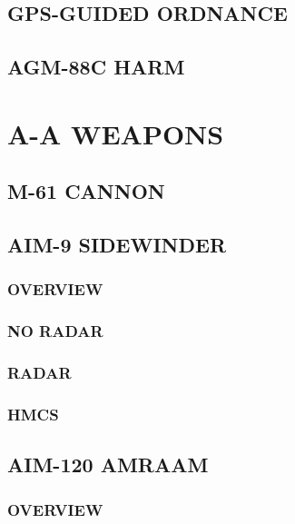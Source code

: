 \documentclass[fontInter]{TechCheck}
\begin{document}
	\clearpage 

	\section{GPS-GUIDED ORDNANCE}

	\clearpage 

	\section{AGM-88C HARM}

	\cleardoublepage

	\chapter{A-A WEAPONS}
	\minitoc
	\cleardoublepage

	\section{M-61 CANNON}

	\clearpage

	\section{AIM-9 SIDEWINDER}
	
	\subsection{OVERVIEW}

	\subsection{NO RADAR}

	\subsection{RADAR}

	\subsection{HMCS}

	\clearpage 

	\section{AIM-120 AMRAAM}

	\subsection{OVERVIEW}
	\begin{tableitemize}
	\end{tableitemize}
	
\end{document}
